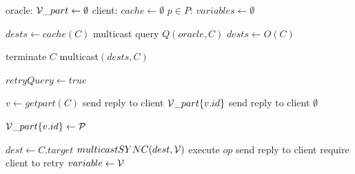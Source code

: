 \begin{algorithm}
\small
\begin{distribalgo}[1]
\vspace{1mm}

    \STATE oracle: $\mathcal{V}\_part \leftarrow \emptyset$
    \STATE client: $cache \leftarrow \emptyset$
    \STATE $p \in P$: $variables \leftarrow \emptyset$
\ENDINDENT

\vspace{1.5mm}

		\STATE $dests \leftarrow cache(C)$
	\ELSE
		\STATE multicast query $Q(oracle, C)$ \label{algline:query_oracle} 		
		\STATE $dests \leftarrow O(C)$ \label{algline:oracle_response} 
	\ENDIF
    
    	\STATE terminate $C$ \label{algline:cli_terminate}
    \ELSE
    	\STATE multicast$(dests, C)$ \label{algline:cli_mcast}
    \ENDIF

    	\STATE $retryQuery \leftarrow true$
	\ENDINDENT
\ENDINDENT

\vspace{1.5mm}

		\STATE $v \leftarrow get part(C)$
			\STATE send reply to client $\mathcal{V}\_part\{v.id\}$
		\ELSE
			\STATE send reply to client $\emptyset$
		\ENDIF
	\ENDINDENT

		\STATE $\mathcal{V}\_part\{v.id\} \leftarrow \mathcal{P}$
	\ENDINDENT
\ENDINDENT

\vspace{1.5mm}

				\STATE $dest \leftarrow C.target$
				\STATE $multicast SYNC(dest,\mathcal{V})$
			\ELSE
				\STATE execute $op$ \label{algline:executeopck}
			\ENDIF
			\STATE send reply to client \label{algline:sendreply}
		\ELSE
			\STATE require client to retry
		\ENDIF
	\ENDINDENT
		\STATE $variable \leftarrow \mathcal{V}$
	\ENDINDENT
\ENDINDENT


\end{distribalgo}
\end{algorithm}
